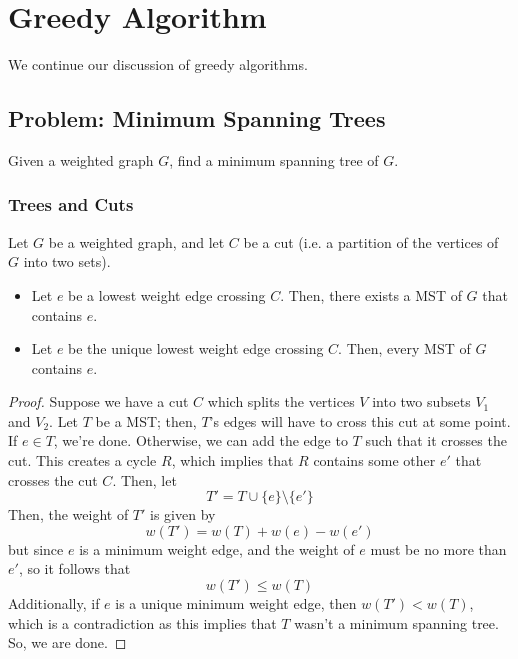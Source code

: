 \documentclass[letterpaper]{article}
\begin{document}
\section{Greedy Algorithm}
We continue our discussion of greedy algorithms.

\subsection{Problem: Minimum Spanning Trees}
Given a weighted graph $G$, find a minimum spanning tree of $G$. 

\subsubsection{Trees and Cuts}
\begin{lemma}{}{}
    Let $G$ be a weighted graph, and let $C$ be a cut (i.e. a partition of the vertices of $G$ into two sets). 
    \begin{itemize}
        \item Let $e$ be a lowest weight edge crossing $C$. Then, there exists a MST of $G$ that contains $e$. 
        \item Let $e$ be the unique lowest weight edge crossing $C$. Then, every MST of $G$ contains $e$. 
    \end{itemize}
\end{lemma}

\begin{mdframed}[]
    \begin{proof}
        Suppose we have a cut $C$ which splits the vertices $V$ into two subsets $V_1$ and $V_2$. Let $T$ be a MST; then, $T$'s edges will have to cross this cut at some point. If $e \in T$, we're done. Otherwise, we can add the edge to $T$ such that it crosses the cut. This creates a cycle $R$, which implies that $R$ contains some other $e'$ that crosses the cut $C$. Then, let
        \[T' = T \cup \{e\} \setminus \{e'\}\]
        Then, the weight of $T'$ is given by 
        \[w(T') = w(T) + w(e) - w(e')\]
        but since $e$ is a minimum weight edge, and the weight of $e$ must be no more than $e'$, so it follows that 
        \[w(T') \leq w(T)\] 
        Additionally, if $e$ is a unique minimum weight edge, then $w(T') < w(T)$, which is a contradiction as this implies that $T$ wasn't a minimum spanning tree. So, we are done. 
    \end{proof}
\end{mdframed}
\end{document}

